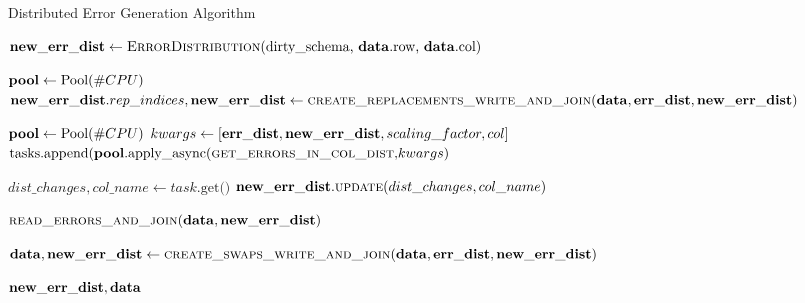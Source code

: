 \begin{algorithm}[!t]
    \caption{Distributed Error Generation Algorithm}\label{alg:dist_generator}
    \begin{algorithmic}[1] 
	  
	  \STATE $\mathbf{new\_err\_dist} \leftarrow \text{\textsc{ErrorDistribution}(dirty\_schema, \ensuremath{\mathbf{data}}.row, \ensuremath{\mathbf{data}}.col)}$
	  
	  
	  \STATE $\mathbf{pool} \leftarrow \text{Pool}(\#CPU)$
	   {
        \STATE $\mathbf{new\_err\_dist}.rep\_indices, \mathbf{new\_err\_dist} \leftarrow \textsc{create\_replacements\_write\_and\_join}(\mathbf{data}, \mathbf{err\_dist}, \mathbf{new\_err\_dist})$ 
      }\ENDFOR
	  
	  
	  \STATE $\mathbf{pool} \leftarrow \text{Pool}(\#CPU)$
	   {
	    \STATE $kwargs \leftarrow [\mathbf{err\_dist}, \mathbf{new\_err\_dist}, scaling\_factor, col]$ 
        \STATE $\text{tasks.append(\ensuremath{\mathbf{pool}}.apply\_async(\textsc{get\_errors\_in\_col\_dist},} kwargs\text{)}$ 
      }\ENDFOR 
      
	   {
        \STATE $dist\_changes, col\_name \leftarrow task\text{.get()}$ 
        \STATE $\mathbf{new\_err\_dist}.\textsc{update}(dist\_changes, col\_name)$ 
      }\ENDFOR 
      
      \STATE $\textsc{read\_errors\_and\_join}(\mathbf{data}, \mathbf{new\_err\_dist})$ 
      
      \STATE $\mathbf{data}, \mathbf{new\_err\_dist} \leftarrow \textsc{create\_swaps\_write\_and\_join}(\mathbf{data}, \mathbf{err\_dist}, \mathbf{new\_err\_dist})$ 
      
      \RETURN $\mathbf{new\_err\_dist}, \mathbf{data}$
    \end{algorithmic}
\end{algorithm}


